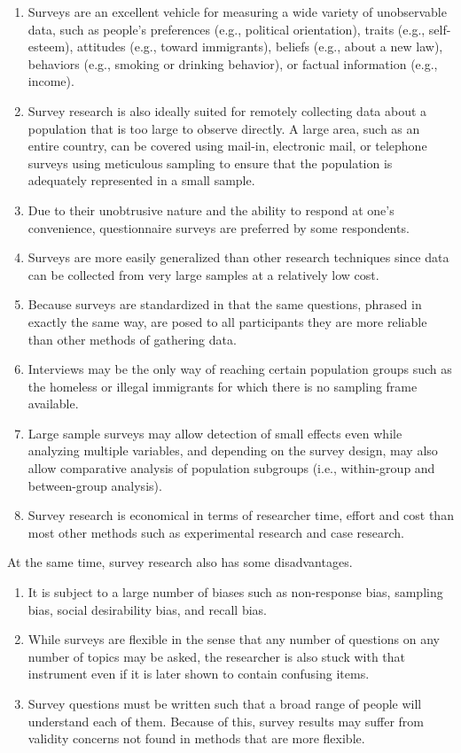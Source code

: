 \begin{enumerate}
	\item Surveys are an excellent vehicle for measuring a wide variety of unobservable data, such as people's preferences (e.g., political orientation), traits (e.g., self-esteem), attitudes (e.g., toward immigrants), beliefs (e.g., about a new law), behaviors (e.g., smoking or drinking behavior), or factual information (e.g., income). 
	\item Survey research is also ideally suited for remotely collecting data about a population that is too large to observe directly. A large area, such as an entire country, can be covered using mail-in, electronic mail, or telephone surveys using meticulous sampling to ensure that the population is adequately represented in a small sample. 
	\item Due to their unobtrusive nature and the ability to respond at one's convenience, questionnaire surveys are preferred by some respondents.
	\item Surveys are more easily generalized than other research techniques since data can be collected from very large samples at a relatively low cost.
	\item Because surveys are standardized in that the same questions, phrased in exactly the same way, are posed to all participants they are more reliable than other methods of gathering data.
	\item Interviews may be the only way of reaching certain population groups such as the homeless or illegal immigrants for which there is no sampling frame available. 
	\item Large sample surveys may allow detection of small effects even while analyzing multiple variables, and depending on the survey design, may also allow comparative analysis of population subgroups (i.e., within-group and between-group analysis). 
	\item Survey research is economical in terms of researcher time, effort and cost than most other methods such as experimental research and case research.
\end{enumerate}

At the same time, survey research also has some disadvantages. 

\begin{enumerate}
	\item It is subject to a large number of biases such as non-response bias, sampling bias, social desirability bias, and recall bias.
	\item While surveys are flexible in the sense that any number of questions on any number of topics may be asked, the researcher is also stuck with that instrument even if it is later shown to contain confusing items. 
	\item Survey questions must be written such that a broad range of people will understand each of them. Because of this, survey results may suffer from validity concerns not found in methods that are more flexible. 
\end{enumerate}
 
